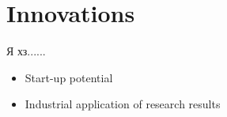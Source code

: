 \chapter*{Innovations}

Я хз......
        \begin{itemize}
            \item Start-up potential 
            \item Industrial application of research results
        \end{itemize}